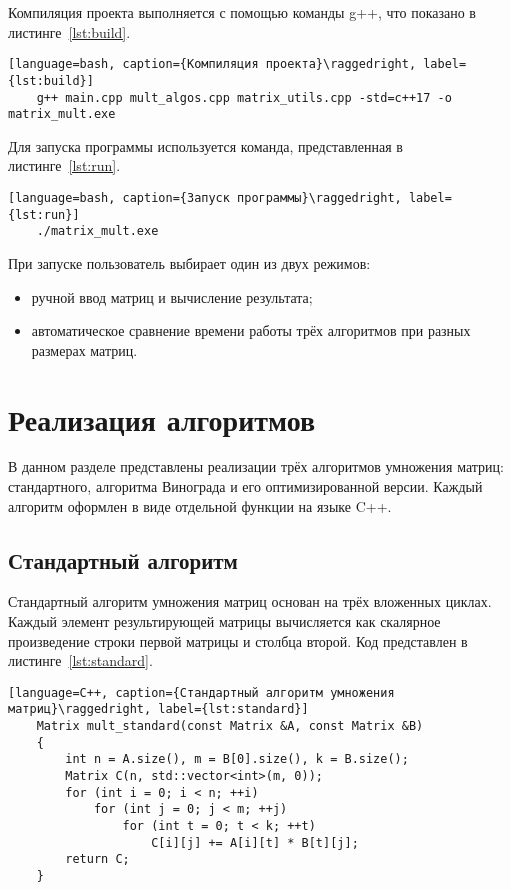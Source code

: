 Компиляция проекта выполняется с помощью команды g++, 
что показано в листинге~\ref{lst:build}.

\begin{lstlisting}[language=bash, caption={Компиляция проекта}\raggedright, label={lst:build}]
	g++ main.cpp mult_algos.cpp matrix_utils.cpp -std=c++17 -o matrix_mult.exe
\end{lstlisting}

Для запуска программы используется команда, представленная в листинге~\ref{lst:run}.

\begin{lstlisting}[language=bash, caption={Запуск программы}\raggedright, label={lst:run}]
	./matrix_mult.exe
\end{lstlisting}

При запуске пользователь выбирает один из двух режимов:
\begin{itemize}
	\item ручной ввод матриц и вычисление результата;
	\item автоматическое сравнение времени работы трёх алгоритмов при разных размерах матриц.
\end{itemize}

\section{Реализация алгоритмов}

В данном разделе представлены реализации трёх алгоритмов умножения матриц: стандартного, алгоритма Винограда и его оптимизированной версии. Каждый алгоритм оформлен в виде отдельной функции на языке C++.

\subsection{Стандартный алгоритм}

Стандартный алгоритм умножения матриц основан на трёх вложенных циклах. Каждый элемент результирующей матрицы вычисляется как скалярное произведение строки первой матрицы и столбца второй. Код представлен в листинге~\ref{lst:standard}.

\begin{lstlisting}[language=C++, caption={Стандартный алгоритм умножения матриц}\raggedright, label={lst:standard}]
	Matrix mult_standard(const Matrix &A, const Matrix &B) 
	{
	    int n = A.size(), m = B[0].size(), k = B.size();
	    Matrix C(n, std::vector<int>(m, 0));
	    for (int i = 0; i < n; ++i)
	        for (int j = 0; j < m; ++j)
	            for (int t = 0; t < k; ++t)
	                C[i][j] += A[i][t] * B[t][j];
	    return C;
	}
\end{lstlisting}


